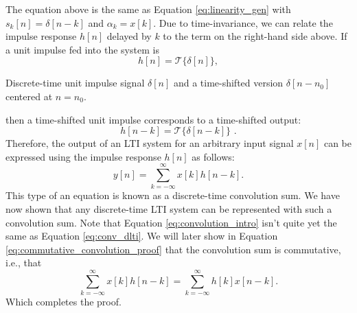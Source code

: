\fi
\noindent The equation above is the same as Equation \ref{eq:linearity_gen} with $s_k[n] = \delta[n-k]$ and $\alpha_k=x[k]$.  Due to time-invariance,
we can relate the impulse response $h[n]$ delayed by $k$ to the term
on the right-hand side above. If a unit impulse fed into the system is
\begin{equation}
h[n] = \mathcal{T}\{\delta[n]\},
\end{equation}
\begin{marginfigure}
  \begin{center}
  \end{center}
  \caption{Discrete-time unit impulse signal $\delta[n]$ and a time-shifted version $\delta[n-n_0]$ centered at $n=n_0$.}
  \label{fig:dt_unit_impulse}
\end{marginfigure}
then a time-shifted unit impulse corresponds to a time-shifted output:
\begin{equation}
h[n-k] = \mathcal{T}\{\delta[n-k]\}\,\,.
\end{equation}
Therefore, the output of an LTI system for an arbitrary input signal
$x[n]$ can be expressed using the impulse response $h[n]$ as follows:
\begin{equation}
  y[n] = \sum_{k=-\infty}^{\infty} x[k]h[n-k].
  \label{eq:convolution_intro}
\end{equation}
This type of an equation is known as a discrete-time convolution sum. We have now shown that any discrete-time LTI system can be represented with such a convolution sum. Note that Equation \ref{eq:convolution_intro} isn't quite yet the same as Equation \ref{eq:conv_dlti}. We will later show in Equation \ref{eq:commutative_convolution_proof} that the convolution sum is commutative, i.e., that
\begin{equation}
 \sum_{k=-\infty}^{\infty} x[k]h[n-k] = \sum_{k=-\infty}^{\infty} h[k]x[n-k].
\end{equation}
Which completes the proof.

